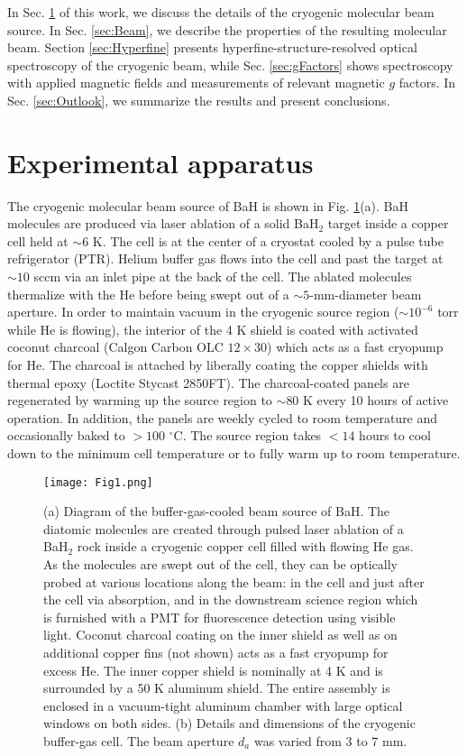 \documentclass[amsmath,amssymb,aps,twocolumn,longbibliography,notitlepage]{revtex4-1}
\begin{document}
In Sec. \ref{sec:Apparatus} of this work, we discuss the details of the cryogenic molecular beam source.  In Sec. \ref{sec:Beam}, we describe the properties of the resulting molecular beam.  Section \ref{sec:Hyperfine} presents hyperfine-structure-resolved optical spectroscopy of the cryogenic beam, while Sec. \ref{sec:gFactors} shows spectroscopy with applied magnetic fields and measurements of relevant magnetic $g$ factors.  In Sec. \ref{sec:Outlook}, we summarize the results and present conclusions.

\section{Experimental apparatus}
\label{sec:Apparatus}

The cryogenic molecular beam source of BaH is shown in Fig. \ref{fig:app}(a).  BaH molecules are produced via laser ablation of a solid BaH$_2$ target inside a copper cell held at $\sim6$ K.  The cell is at the center of a cryostat cooled by a pulse tube refrigerator (PTR).  Helium buffer gas flows into the cell and past the target at $\sim10$ sccm via an inlet pipe at the back of the cell.  The ablated molecules thermalize with the He before being swept out of a $\sim5$-mm-diameter beam aperture.  In order to maintain vacuum in the cryogenic source region ($\sim10^{-6}$ torr while He is flowing), the interior of the 4 K shield is coated with activated coconut charcoal (Calgon Carbon OLC $12\times30$) which acts as a fast cryopump for He.  The charcoal is attached by liberally coating the copper shields with thermal epoxy (Loctite Stycast 2850FT).  The charcoal-coated panels are regenerated by warming up the source region to $\sim80$ K every 10 hours of active operation.  In addition, the panels are weekly cycled to room temperature and occasionally baked to $>100$ $^{\circ}$C.  The source region takes $<14$ hours to cool down to the minimum cell temperature or to fully warm up to room temperature.
\begin{figure}[h]
\texttt{[image: Fig1.png]}%
\caption{(a) Diagram of the buffer-gas-cooled beam source of BaH.  The diatomic molecules are created through pulsed laser ablation of a BaH$_2$ rock inside a cryogenic copper cell filled with flowing He gas.  As the molecules are swept out of the cell, they can be optically probed at various locations along the beam:  in the cell and just after the cell via absorption, and in the downstream science region which is furnished with a PMT for fluorescence detection using visible light.  Coconut charcoal coating on the inner shield as well as on additional copper fins (not shown) acts as a fast cryopump for excess He.  The inner copper shield is nominally at 4 K and is surrounded by a 50 K aluminum shield.  The entire assembly is enclosed in a vacuum-tight aluminum chamber with large optical windows on both sides.  (b) Details and dimensions of the cryogenic buffer-gas cell.  The beam aperture $d_a$ was varied from 3 to 7 mm.}
\label{fig:app}
\centering
\end{figure}
\end{document}

